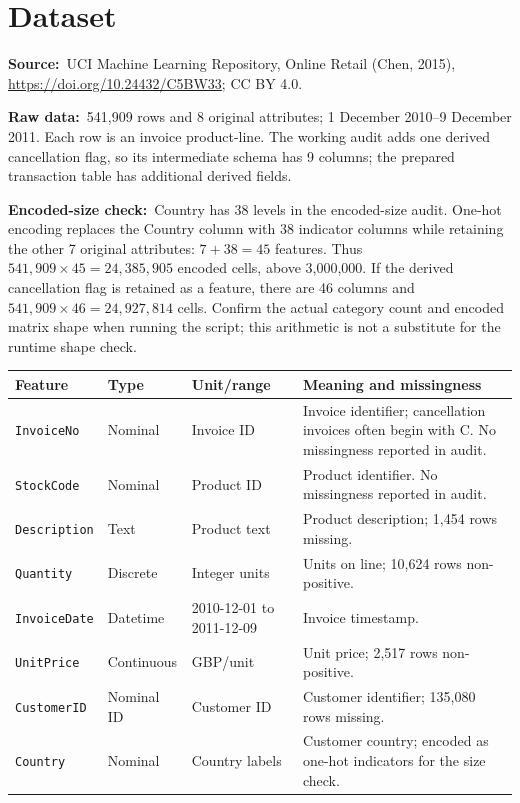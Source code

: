 \documentclass[10pt,a4paper,twocolumn]{article}
\newcommand{\eg}[1]{\textcolor{eg}{#1}}
\newcommand{\field}[2]{\textbf{#1}~\eg{#2}\par}
\newcommand{\code}[1]{\texttt{#1}}
\begin{document}
\section{Dataset}
\field{Source:}{UCI Machine Learning Repository, Online Retail (Chen, 2015), \url{https://doi.org/10.24432/C5BW33}; CC BY 4.0.}
\field{Raw data:}{541,909 rows and 8 original attributes; 1 December 2010--9 December 2011. Each row is an invoice product-line. The working audit adds one derived cancellation flag, so its intermediate schema has 9 columns; the prepared transaction table has additional derived fields.}
\field{Encoded-size check:}{Country has 38 levels in the encoded-size audit. One-hot encoding replaces the Country column with 38 indicator columns while retaining the other 7 original attributes: $7+38=45$ features. Thus $541{,}909\times45=24{,}385{,}905$ encoded cells, above 3,000,000. If the derived cancellation flag is retained as a feature, there are 46 columns and $541{,}909\times46=24{,}927{,}814$ cells. Confirm the actual category count and encoded matrix shape when running the script; this arithmetic is not a substitute for the runtime shape check.}
{\footnotesize
\begin{tabularx}{\linewidth}{@{}L{2.0cm} L{1.7cm} L{1.4cm} Y@{}}
\toprule
\textbf{Feature} & \textbf{Type} & \textbf{Unit/range} & \textbf{Meaning and missingness}\\
\midrule
\code{InvoiceNo} & Nominal & Invoice ID & Invoice identifier; cancellation invoices often begin with C. No missingness reported in audit.\\
\code{StockCode} & Nominal & Product ID & Product identifier. No missingness reported in audit.\\
\code{Description} & Text & Product text & Product description; 1,454 rows missing.\\
\code{Quantity} & Discrete & Integer units & Units on line; 10,624 rows non-positive.\\
\code{InvoiceDate} & Datetime & 2010-12-01 to 2011-12-09 & Invoice timestamp.\\
\code{UnitPrice} & Continuous & GBP/unit & Unit price; 2,517 rows non-positive.\\
\code{CustomerID} & Nominal ID & Customer ID & Customer identifier; 135,080 rows missing.\\
\code{Country} & Nominal & Country labels & Customer country; encoded as one-hot indicators for the size check.\\
\bottomrule
\end{tabularx}}
\end{document}
